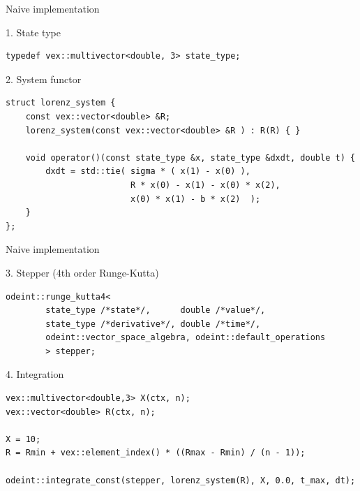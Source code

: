 \documentclass[@BEAMER_OPTIONS@]{beamer}
\begin{document}
\begin{frame}[fragile]{Naive implementation}
    \begin{exampleblock}{1. State type}
        \begin{lstlisting}
typedef vex::multivector<double, 3> state_type;
        \end{lstlisting}
    \end{exampleblock}

    \begin{exampleblock}{2. System functor}
        \begin{lstlisting}[firstnumber=last]
struct lorenz_system {
    const vex::vector<double> &R;
    lorenz_system(const vex::vector<double> &R ) : R(R) { }

    void operator()(const state_type &x, state_type &dxdt, double t) {
        dxdt = std::tie( sigma * ( x(1) - x(0) ),
                         R * x(0) - x(1) - x(0) * x(2),
                         x(0) * x(1) - b * x(2)  );
    }
};
        \end{lstlisting}
    \end{exampleblock}
\end{frame}


\begin{frame}[fragile]{Naive implementation}
    \begin{exampleblock}{3. Stepper (4th order Runge-Kutta)}
        \begin{lstlisting}[firstnumber=last]
odeint::runge_kutta4<
        state_type /*state*/,      double /*value*/,
        state_type /*derivative*/, double /*time*/,
        odeint::vector_space_algebra, odeint::default_operations
        > stepper;
        \end{lstlisting}
    \end{exampleblock}
    \begin{exampleblock}{4. Integration}
        \begin{lstlisting}[firstnumber=last]
vex::multivector<double,3> X(ctx, n);
vex::vector<double> R(ctx, n);

X = 10;
R = Rmin + vex::element_index() * ((Rmax - Rmin) / (n - 1));

odeint::integrate_const(stepper, lorenz_system(R), X, 0.0, t_max, dt);
        \end{lstlisting}
    \end{exampleblock}
\end{frame}
\end{document}
